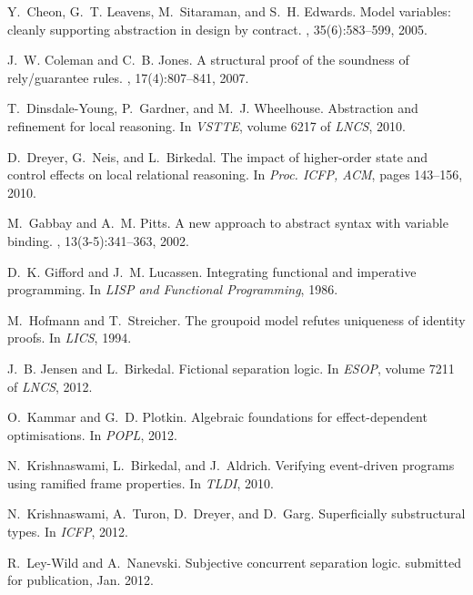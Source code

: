 \documentclass[orivec]{llncs}
\begin{document}
\begin{thebibliography}{10}
Y.~Cheon, G.~T. Leavens, M.~Sitaraman, and S.~H. Edwards.
\newblock Model variables: cleanly supporting abstraction in design by
  contract.
, 35(6):583--599, 2005.


J.~W. Coleman and C.~B. Jones.
\newblock A structural proof of the soundness of rely/guarantee rules.
, 17(4):807--841, 2007.

T.~Dinsdale-Young, P.~Gardner, and M.~J. Wheelhouse.
\newblock Abstraction and refinement for local reasoning.
\newblock In {\em VSTTE}, volume 6217 of {\em LNCS}, 2010.

D.~Dreyer, G.~Neis, and L.~Birkedal.
\newblock The impact of higher-order state and control effects on local
  relational reasoning.
\newblock In {\em Proc. ICFP, ACM}, pages 143--156, 2010.

M.~Gabbay and A.~M. Pitts.
\newblock A new approach to abstract syntax with variable binding.
, 13(3-5):341--363, 2002.

D.~K. Gifford and J.~M. Lucassen.
\newblock Integrating functional and imperative programming.
\newblock In {\em LISP and Functional Programming}, 1986.

M.~Hofmann and T.~Streicher.
\newblock The groupoid model refutes uniqueness of identity proofs.
\newblock In {\em LICS}, 1994.

J.~B. Jensen and L.~Birkedal.
\newblock Fictional separation logic.
\newblock In {\em ESOP}, volume 7211 of {\em LNCS}, 2012.

O.~Kammar and G.~D. Plotkin.
\newblock Algebraic foundations for effect-dependent optimisations.
\newblock In {\em POPL}, 2012.

N.~Krishnaswami, L.~Birkedal, and J.~Aldrich.
\newblock Verifying event-driven programs using ramified frame properties.
\newblock In {\em TLDI}, 2010.

N.~Krishnaswami, A.~Turon, D.~Dreyer, and D.~Garg.
\newblock Superficially substructural types.
\newblock In {\em ICFP}, 2012.

R.~Ley-Wild and A.~Nanevski.
\newblock Subjective concurrent separation logic.
\newblock submitted for publication, Jan. 2012.



\end{thebibliography}
\end{document}
